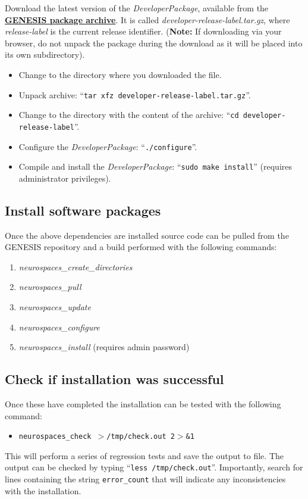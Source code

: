 \documentclass[12pt]{article}
\begin{document}
Download the latest version of the {\it DeveloperPackage}, available from the \href{http://repo-genesis3.cbi.utsa.edu/src/}{\bf GENESIS package archive}.  It is called {\it developer-release-label.tar.gz}, where {\it release-label} is the current release identifier. ({\bf Note:} If downloading via your browser, do not unpack the package during the download as it will be placed into its own subdirectory).
\begin{itemize}
   \item[] Change to the directory where you downloaded the file.
   \item[] Unpack archive: ``{\tt tar xfz developer-release-label.tar.gz}''.
   \item[] Change to the directory with the content of the archive: ``{\tt cd developer-release-label}''.
   \item[] Configure the {\it DeveloperPackage}: ``{\tt ./configure}''.
   \item[] Compile and install the {\it DeveloperPackage}: ``{\tt sudo make install}'' (requires administrator privileges).
\end{itemize}

\subsection*{Install software packages}

Once the above dependencies are installed source code can be pulled from the GENESIS repository and a build performed with the following commands:
\begin{enumerate}
   \item{\it neurospaces\_create\_directories}
   \item{\it neurospaces\_pull}
   \item{\it neurospaces\_update}
   \item{\it neurospaces\_configure}
   \item{\it neurospaces\_install} (requires admin password) 
\end{enumerate}

\subsection*{Check if installation was successful}

Once these have completed the installation can be tested with the following command:
\begin{itemize}
   \item[]{\tt neurospaces\_check $>$/tmp/check.out 2$>$\&1}
\end{itemize}
This will perform a series of regression tests and save the output to file. The output can be checked by typing ``{\tt less /tmp/check.out}''. Importantly, search for lines containing the string {\tt error\_count} that will indicate any inconsistencies with the installation.
\end{document}
